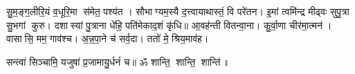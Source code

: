 
सु॒म॒ङ्ग॒लीरि॒यं व॒धूरि॒मा स॑मेत॒ पश्य॑त । सौभाग्यम॒स्यै द॒त्त्वायाथास्तं॒ वि परे॑तन। इ॒मां त्वमि॑न्द्र मीढ्वः सुपु॒त्रा सु॒भगां कुरु। दशास्यां पु॒त्राना धे॑हि॒ पति॑मेकाद॒शं कृ॑धि॥ आ॒वह॑न्ती वितन्वा॒ना। कु॒र्वा॒णा चीर॑मा॒त्मन॑। वासासि॒ मम॒ गाव॑श्च। अ॒न्न॒पा॒ने च॑ सर्व॒दा। ततो॑ मे॒ श्रिय॒माव॑ह।

सन्त्वा॑ सिञ्चामि॒ यजुषा॑ प्र॒जामायु॒र्धनं॑ च॥ ॐ शान्ति॒ शान्ति॒ शान्ति॑॥
\closesection
